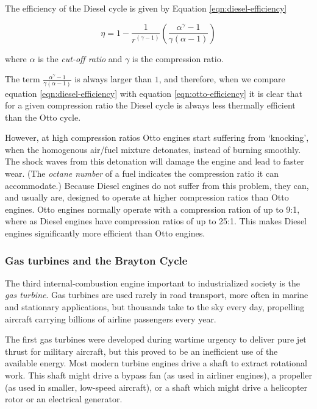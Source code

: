 The efficiency of the Diesel cycle is given by Equation \ref{eqn:diesel-efficiency}

\begin{equation}
	\eta = 1 - \frac{1}{r^{(\gamma - 1 )}}(\frac{\alpha^{\gamma}-1}{\gamma(\alpha-1)})
\label{eqn:diesel-efficiency}
\end{equation}
 
where \(\alpha\) is the \textit{cut-off ratio} and \(\gamma\) is the compression ratio.

The term \( \frac{\alpha^{\gamma}-1}{\gamma(\alpha-1)} \) is always larger
than \(1 \), and therefore, when we compare equation \ref{eqn:diesel-efficiency}
with equation \ref{eqn:otto-efficiency} it is clear that for a given
compression ratio the Diesel cycle is always less thermally efficient than the
Otto cycle. 

However, at high compression ratios Otto engines start suffering from
`knocking', when the homogenous air/fuel mixture detonates, instead of burning
smoothly. The shock waves from this detonation will damage the engine and lead
to faster wear. (The \textit{octane number} of a fuel indicates the compression
ratio it can accommodate.) Because Diesel engines do not suffer from this
problem, they can, and usually are, designed to operate at higher compression
ratios than Otto engines.  Otto engines normally operate with a compression
ration of up to 9:1, where as Diesel engines have compression ratios of up to
25:1. This makes Diesel engines significantly more efficient than Otto engines. 

\subsubsection{Gas turbines and the Brayton Cycle}

The third internal\hyp{}combustion engine important to industrialized society is
the \textit{gas turbine}. Gas turbines are used rarely in road transport, more
often in marine and stationary applications, but thousands take to the sky
every day, propelling aircraft \autocite{Morris2017} carrying billions of airline
passengers every year.

The first gas turbines were developed during wartime urgency to deliver pure jet
thrust for military aircraft, but this proved to be an inefficient use of the
available energy. Most modern turbine engines drive a shaft to extract
rotational work. This shaft might drive a bypass fan (as used in airliner engines), a
propeller (as used in smaller, low-speed aircraft), or a shaft which might drive
a helicopter rotor or an electrical generator.

